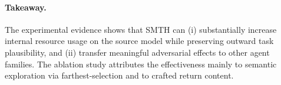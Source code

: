 \paragraph{Takeaway.} The experimental evidence shows that SMTH can (i) substantially increase internal resource usage on the source model while preserving outward task plausibility, and (ii) transfer meaningful adversarial effects to other agent families. The ablation study attributes the effectiveness mainly to semantic exploration via farthest-selection and to crafted return content.
